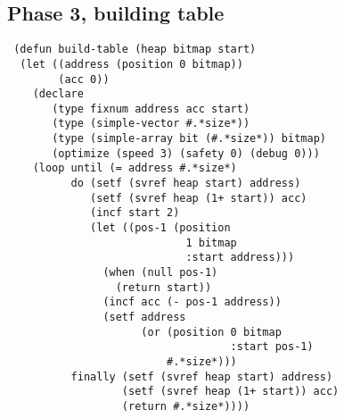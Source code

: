 \subsection{Phase 3, building table}

{\small\begin{verbatim}
 (defun build-table (heap bitmap start)
  (let ((address (position 0 bitmap))
        (acc 0))
    (declare 
       (type fixnum address acc start)
       (type (simple-vector #.*size*))
       (type (simple-array bit (#.*size*)) bitmap)
       (optimize (speed 3) (safety 0) (debug 0)))
    (loop until (= address #.*size*)
          do (setf (svref heap start) address)
             (setf (svref heap (1+ start)) acc)
             (incf start 2)
             (let ((pos-1 (position 
                            1 bitmap 
                            :start address)))
               (when (null pos-1)
                 (return start))
               (incf acc (- pos-1 address))
               (setf address 
                     (or (position 0 bitmap 
                                   :start pos-1)
                         #.*size*)))
          finally (setf (svref heap start) address)
                  (setf (svref heap (1+ start)) acc)
                  (return #.*size*))))
\end{verbatim}}
